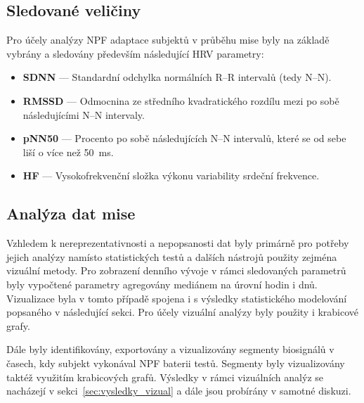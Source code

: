 \subsection{Sledované veličiny}
\label{subsec:sledovane_veliciny}
Pro účely analýzy \gls{NPF} adaptace subjektů v průběhu mise byly na
základě~\cite{Pereira2017,Shaffer2017} vybrány a sledovány především následující
\gls{HRV} parametry:
\begin{itemize}
      \item \textbf{SDNN} --- Standardní odchylka normálních R--R intervalů (tedy
            N--N).
      \item \textbf{RMSSD} --- Odmocnina ze středního kvadratického rozdílu mezi
            po sobě následujícími N--N intervaly.
      \item \textbf{pNN50} --- Procento po sobě následujících N--N intervalů,
            které se od sebe liší o více než 50~ms.
      \item \textbf{HF} --- Vysokofrekvenční složka výkonu variability srdeční
            frekvence.
\end{itemize}

\subsection{Analýza dat mise}
\label{subsec:analyza_diana}
Vzhledem k nereprezentativnosti a nepopsanosti dat byly primárně pro potřeby
jejich analýzy namísto statistických testů a dalších nástrojů použity zejména
vizuální metody. Pro zobrazení denního vývoje v rámci sledovaných parametrů byly
vypočtené parametry agregovány mediánem na úrovní hodin i dnů. Vizualizace byla
v tomto případě spojena i s výsledky statistického modelování popsaného v
následující sekci. Pro účely vizuální analýzy byly použity i krabicové grafy.

Dále byly identifikovány, exportovány a vizualizovány segmenty biosignálů v
časech, kdy subjekt vykonával \gls{NPF} baterii testů. Segmenty byly
vizualizovány taktéž využitím krabicových grafů. Výsledky v rámci vizuálních
analýz se nacházejí v sekci~\ref{sec:vysledky_vizual} a dále jsou probírány v
samotné diskuzi.

